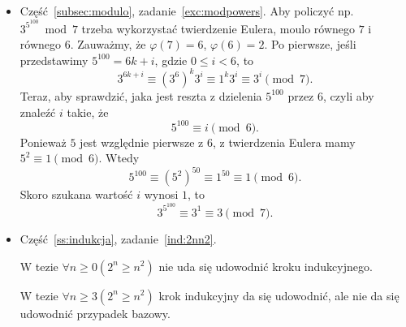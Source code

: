 \documentclass[12pt]{article}
\begin{document}
\begin{itemize}
	\item Część~\ref{subsec:modulo}, zadanie~\ref{exc:modpowers}.
	Aby policzyć np. $3^{5^100} \bmod 7$ trzeba wykorzystać 
	twierdzenie Eulera, moulo równego $7$ i równego $6$.
	Zauważmy, że $\varphi(7)=6$, $\varphi(6)=2$.
	Po pierwsze, jeśli przedstawimy $5^{100} = 6k+i$, gdzie $0\leq i<6$, to 
	\[
	3^{6k+i} \equiv (3^6)^k3^i \equiv 1^k3^i \equiv 3^i \pmod 7.
	\]
	Teraz, aby sprawdzić, jaka jest reszta z dzielenia $5^100$ przez $6$, czyli aby znaleźć $i$ takie, że 
	\[
	5^{100}\equiv i \pmod 6.
	\]
	Ponieważ $5$ jest względnie pierwsze z $6$, z twierdzenia Eulera mamy $5^2 \equiv 1 \pmod 6$.
	Wtedy 
	\[
	5^100 \equiv (5^2)^{50} \equiv 1^{50} \equiv 1 \pmod 6.
	\]
	Skoro szukana wartość $i$ wynosi $1$, to 
	\[
	3^{5^100} \equiv 3^1 \equiv 3 \pmod 7.
	\]
    \item Część~\ref{ss:indukcja}, zadanie~\ref{ind:2nn2}. 
     
     W tezie $\forall n\geq 0 (2^n\geq n^2)$ nie uda się 
     udowodnić kroku indukcyjnego.
     
     W tezie $\forall n\geq 3 (2^n\geq n^2)$ krok indukcyjny da się udowodnić, ale nie da się udowodnić przypadek bazowy.
\end{itemize}



\end{document}
